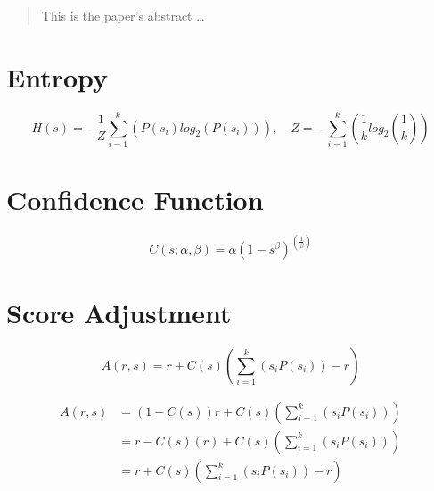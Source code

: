 \documentclass[12pt]{article}
\begin{document}
\maketitle

\begin{abstract}
This is the paper's abstract \ldots
\end{abstract}

\section{Entropy}

\begin{equation}
	H(s) = -\frac{1}{Z}\sum_{i=1}^k (P(s_i) log_2(P(s_i))), \quad Z=-\sum_{i=1}^k \left(\frac{1}{k} log_2 \left(\frac{1}{k}\right)\right)
\end{equation}


\section{Confidence Function}

\begin{equation}
	C(s; \alpha, \beta) = \alpha (1-s^\beta)^{\left(\frac{1}{\beta}\right)}
\end{equation}


\section{Score Adjustment}

\begin{equation}
	A(r, s) = r + C(s) \left(\sum_{i=1}^k \left( s_i P(s_i)\right) - r \right)
\end{equation}

\begin{align}
	A(r, s) &= (1-C(s)) r + C(s) \left(\sum_{i=1}^k \left( s_i P(s_i)\right) \right)\\
	&= r - C(s)(r) + C(s) \left(\sum_{i=1}^k \left( s_i P(s_i)\right) \right)\\
	&= r + C(s) \left(\sum_{i=1}^k \left( s_i P(s_i)\right) - r \right)
\end{align}




\end{document}
